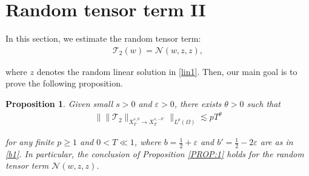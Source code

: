 \documentclass[%
11pt,  reqno]{amsart}
\newtheorem{proposition}[theorem]{Proposition}
\newcommand{\1}{\hspace{0.2mm}\text{I}\hspace{0.2mm}}
\newcommand{\noi}{\noindent}
\newcommand{\eps}{\varepsilon}
\newcommand{\ta}{\theta}
\renewcommand{\O}{\Omega}
\newcommand{\les}{\lesssim}
\newcommand{\NN}{\mathcal{N}}
\numberwithin{equation}{section}
\numberwithin{theorem}{section}
\newcommand{\TT}{\mathcal{T}}
\begin{document}
\section{Random tensor term II}
\label{SEC:RT2}




In this section, we estimate
the  random tensor term:
\begin{align}\label{RA0}
\TT_2(w) =  \NN (w,z, z), 
\end{align}

\noi
where $z$ denotes the random linear solution in \eqref{lin1}.
Then, our main goal is to prove the following proposition.




\begin{proposition}
\label{PROP:RT2}
Given small   $s > 0$ and $\eps > 0$, 
 there exists $\ta > 0$
such that 
\begin{align*}
\Big\| \| \TT_2 \|_{X^{s,b}_T \to 
X^{s,-b'}_T} \Big\|_{L^p (\O)} 
\les p  T^\ta
\end{align*}

\noi
for any finite $p \ge 1$ and $0 < T\ll 1$, where 
$b = \frac 12 + \eps$ and $b' = \frac 12 - 2\eps$
are as in \eqref{b1}.
In particular, 
 the conclusion of Proposition \ref{PROP:1}
holds
for the random tensor term $\NN(w, z, z)$.




\end{proposition}
\end{document}

